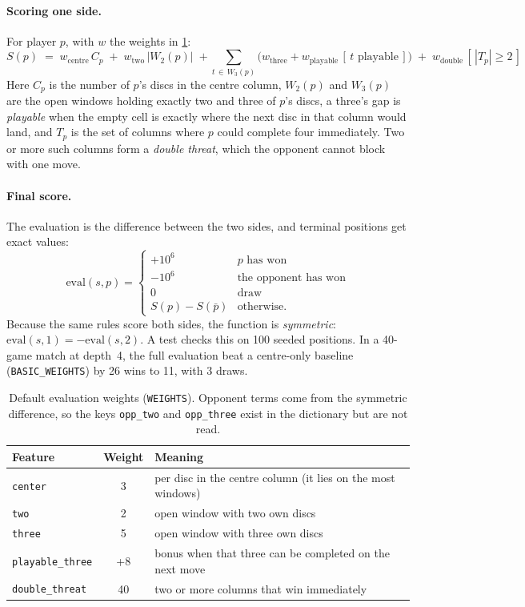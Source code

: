 \documentclass[11pt,a4paper]{article}
\newcommand{\code}[1]{\texttt{\small #1}}
\begin{document}
\paragraph{Scoring one side.} For player $p$, with $w$ the weights in \cref{tab:weights}:
\begin{equation}
S(p) \;=\; w_{\text{centre}}\,C_p \;+\; w_{\text{two}}\,|W_2(p)| \;+\! \sum_{t\,\in\, W_3(p)} \!\big(w_{\text{three}} + w_{\text{playable}}\,[\,t \text{ playable}\,]\big) \;+\; w_{\text{double}}\,[\,|T_p|\ge 2\,]
\end{equation}
Here $C_p$ is the number of $p$'s discs in the centre column, $W_2(p)$ and $W_3(p)$ are the open windows holding exactly two and three of $p$'s discs, a three's gap is \emph{playable} when the empty cell is exactly where the next disc in that column would land, and $T_p$ is the set of columns where $p$ could complete four immediately. Two or more such columns form a \emph{double threat}, which the opponent cannot block with one move.

\paragraph{Final score.} The evaluation is the difference between the two sides, and terminal positions get exact values:
\begin{equation}
\text{eval}(s,p) = \begin{cases} +10^6 & p \text{ has won}\\ -10^6 & \text{the opponent has won}\\ 0 & \text{draw}\\ S(p) - S(\bar p) & \text{otherwise.}\end{cases}
\end{equation}
Because the same rules score both sides, the function is \emph{symmetric}: $\text{eval}(s,1) = -\text{eval}(s,2)$. A test checks this on 100 seeded positions. In a 40-game match at depth~4, the full evaluation beat a centre-only baseline (\code{BASIC\_WEIGHTS}) by 26 wins to 11, with 3 draws.

\begin{table}[ht]
\centering\small
\caption{Default evaluation weights (\code{WEIGHTS}). Opponent terms come from the symmetric difference, so the keys \code{opp\_two} and \code{opp\_three} exist in the dictionary but are not read.}
\label{tab:weights}
\begin{tabular}{@{}lcl@{}}
\toprule
\textbf{Feature} & \textbf{Weight} & \textbf{Meaning} \\
\midrule
\code{center} & 3 & per disc in the centre column (it lies on the most windows) \\
\code{two} & 2 & open window with two own discs \\
\code{three} & 5 & open window with three own discs \\
\code{playable\_three} & +8 & bonus when that three can be completed on the next move \\
\code{double\_threat} & 40 & two or more columns that win immediately \\
\bottomrule
\end{tabular}
\end{table}
\end{document}
